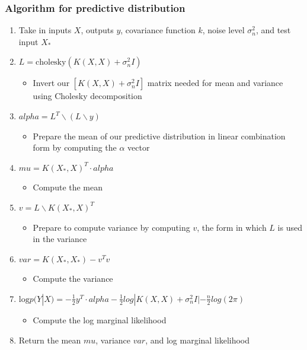 \documentclass[10pt]{article}
\begin{document}
\subsubsection{Algorithm for predictive distribution}
\begin{enumerate}
    \item Take in inputs $X$, outputs $y$, covariance function $k$, noise level $\sigma^2_n$, and test input $X_*$
    \item $L = \text{cholesky}(K(X,X) + \sigma_n^2I)$
    \begin{itemize}
        \item Invert our $[K(X,X) + \sigma^2_nI]$ matrix needed for mean and variance using Cholesky decomposition
    \end{itemize}
    \item $alpha = L^T \backslash (L \backslash y)$
    \begin{itemize}
        \item Prepare the mean of our predictive distribution in linear combination form by computing the $\alpha$ vector
    \end{itemize}
    \item $mu = K(X_*, X)^T \cdot alpha$
    \begin{itemize}
        \item Compute the mean
    \end{itemize}
    \item $v = L \backslash K(X_*, X)^T$
    \begin{itemize}
        \item Prepare to compute variance by computing $v$, the form in which $L$ is used in the variance
    \end{itemize}
    \item $var = K(X_*, X_*) - v^T v$
    \begin{itemize}
        \item Compute the variance
    \end{itemize}
    \item $\text{log} p(Y|X) = -\frac{1}{2}y^T \cdot alpha - \frac{1}{2}log|K(X,X) + \sigma^2_nI| - \frac{n}{2}log(2\pi)$
    \begin{itemize}
        \item Compute the log marginal likelihood 
    \end{itemize}
    \item Return the mean $mu$, variance $var$, and log marginal likelihood
\end{enumerate}
\end{document}
